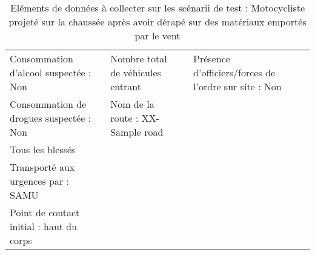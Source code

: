 \documentclass[a4paper,12pt,twoside,french]{book}
[a4paper,12pt,twoside]
\begin{document}
\begin{landscape}
\begin{table}[]
\begin{adjustbox}{width=2.1\textwidth,center=\textwidth}
\begin{tabular}{|l|l|l|l|l}
Consommation d'alcool suspectée : Non                                                        & Nombre total de véhicules entrant                          &                                                                                     & Présence d'officiers/forces de l'ordre sur site : Non &  \\
Consommation de drogues suspectée : Non                                                      & Nom de la route : XX-Sample road                           &                                                                                     &                                                       &  \\
{\color[HTML]{196B24} Tous les blessés}                                                      &                                                            &                                                                                     &                                                       &  \\
Transporté aux urgences par : SAMU                                                           &                                                            &                                                                                     &                                                       &  \\
Point de contact initial : haut du corps                                                     &                                                            &                                                                                     &                                                       & \\
\hline
\end{tabular}
\end{adjustbox}
\caption{Eléments de données à collecter sur les scénarii de test : Motocycliste   projeté sur la chaussée après avoir dérapé sur des matériaux emportés par le   vent}
\label{tab:collect_scenario_1}
\end{table}
\end{landscape}
\end{document}

